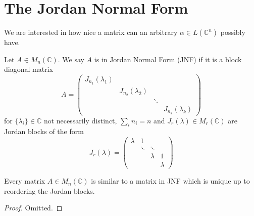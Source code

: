 \section{The Jordan Normal Form}
We are interested in how nice a matrix can an arbitrary $\alpha\in L(\mathbb C^n)$ possibly have.
\begin{definition}
    Let $A\in M_n(\mathbb C)$.
    We say $A$ is in Jordan Normal Form (JNF) if it is a block diagonal matrix
    $$A=\begin{pmatrix}
        J_{n_1}(\lambda_1)&&&\\
        &J_{n_2}(\lambda_2)&&\\
        &&\ddots&\\
        &&&J_{n_k}(\lambda_k)
    \end{pmatrix}$$
    for $\{\lambda_i\}\in\mathbb C$ not necessarily distinct, $\sum_in_i=n$ and $J_r(\lambda)\in M_r(\mathbb C)$ are Jordan blocks of the form
    $$J_r(\lambda)=\begin{pmatrix}
        \lambda&1&&\\
        &\ddots&\ddots&\\
        &&\lambda&1\\
        &&&\lambda
    \end{pmatrix}$$
\end{definition}
\begin{theorem}
    Every matrix $A\in M_n(\mathbb C)$ is similar to a matrix in JNF which is unique up to reordering the Jordan blocks.
\end{theorem}
\begin{proof}
    Omitted.
\end{proof}
